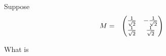 \documentclass[10pt]{article}
\begin{document}
Suppose
\begin{eqnarray*}
\boldmath{M} &=& 
\begin{pmatrix}
\frac{1}{\sqrt 2} & -\frac{1}{\sqrt 2 } \\
\frac{1}{\sqrt 2} & \frac{1}{\sqrt 2}
\end{pmatrix}
\end{eqnarray*}

What is 
\end{document}

